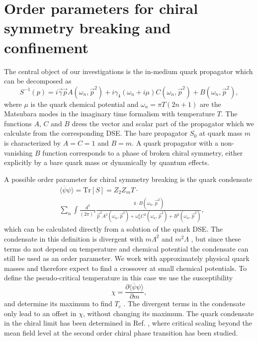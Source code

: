 \documentclass[a4paper,fleqn]{cls/cas-dc}
\begin{document}
\section{Order parameters for chiral symmetry breaking and confinement}
The central object of our investigations is the in-medium quark propagator which can be decomposed as
\begin{equation}
	S^{-1}(p) = i \vec{\gamma} \vec{p} A(\omega_n, \vec{p}^2) + i \gamma_4(\omega_n + i\mu)C(\omega_n, \vec{p}^2) + B(\omega_n,\vec{p}^2) ,
\end{equation}
where $\mu$ is the quark chemical potential and $\omega_n = \pi T( 2n + 1 )$ are the Matsubara modes in the imaginary time formalism
with temperature $T$. The functions $A$, $C$ and $B$ dress the vector and scalar part of the propagator which we calculate from the
corresponding DSE. The bare propagator $S_0$ at quark mass $m$ is characterized by $A = C = 1$ and $B = m$. A quark propagator
with a non-vanishing $B$ function corresponds to a phase of broken chiral symmetry, either explicitly by a bare quark mass
or dynamically by quantum effects.

A possible order parameter for chiral symmetry breaking is the quark condensate
\begin{equation}
\begin{split}
	&\langle \overline{\psi} \psi \rangle = \text{Tr}[S] = Z_2 Z_m T \cdot \\
	&\sum_n \int \frac{d^3}{(2 \pi)^3} \frac{4 \cdot B(\omega_n, \vec{p}^2)}{\vec{p}^2 A^2(\omega_n, \vec{p}^2) + \omega_n^2 C^2(\omega_n, \vec{p}^2) + B^2(\omega_n, \vec{p}^2)},
	\end{split}
\end{equation}
which can be calculated directly from a solution of the quark DSE. The condensate in this definition is divergent with $m \Lambda^2$
and $m^2 \Lambda$ , but since these terms do not depend on temperature and chemical potential the condensate can still be used as
an order parameter. We work with approximately physical quark masses and therefore expect to find a crossover at small
chemical potentials. To define the pseudo-critical temperature in this case we use the susceptibility
\begin{equation}
	\chi = \frac{\partial \langle \overline{\psi}\psi \rangle}{\partial m},
\end{equation}
and determine its maximum to find $T_c$ . The divergent terms in the condensate only lead to an offset in $\chi$, without changing
its maximum. The quark condensate in the chiral limit has been determined in Ref. \cite{PhysRevD.84.054013}, where critical scaling beyond the
mean field level at the second order chiral phase transition has been studied.
\end{document}
